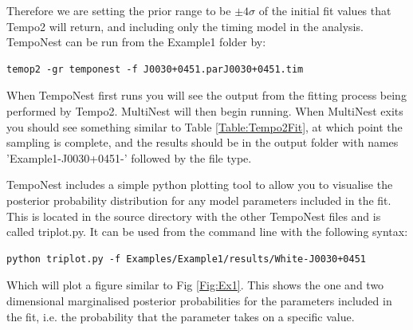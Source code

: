 \documentclass[%
 preprint,
 amsmath,amssymb,amsfonts,
 aps,
]{revtex4-1}
\begin{document}
Therefore we are setting the prior range to be $\pm 4\sigma$ of the initial fit values that Tempo2 will return, and including only the timing model in the analysis.
TempoNest can be run from the Example1 folder by:
%
\begin{lstlisting}
temop2 -gr temponest -f J0030+0451.parJ0030+0451.tim
\end{lstlisting}
%
When TempoNest first runs you will see the output from the fitting process being performed by Tempo2.   MultiNest will then begin running. When MultiNest exits you should see something similar to Table \ref{Table:Tempo2Fit}, at which point the sampling is complete, and the results should be in the output folder with names 'Example1-J0030+0451-' followed by the file type.  

TempoNest includes a simple python plotting tool to allow you to visualise the posterior probability distribution for any model parameters included in the fit.  This is located in the source directory with the other TempoNest files and is called triplot.py.  It can be used from the command line with the following syntax:

\begin{lstlisting}
python triplot.py -f Examples/Example1/results/White-J0030+0451
\end{lstlisting}
%
Which will plot a figure similar to Fig \ref{Fig:Ex1}.  This shows the one and two dimensional marginalised posterior probabilities for the parameters included in the fit, i.e. the probability that the parameter takes on a specific value.
\end{document}

